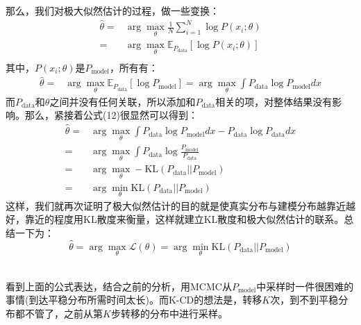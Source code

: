 \documentclass[a4paper]{article}
\begin{document}
那么，我们对极大似然估计的过程，做一些变换：
\begin{equation}
    \begin{split}
        \hat{\theta} = & \arg\max_{\theta} \frac{1}{N} \sum_{i=1}^N \log P(x_i;\theta) \\
        = & \arg\max_{\theta} \mathbb{E}_{P_{\mathrm{data}}}[ \log P(x_i;\theta)] \\
    \end{split}
\end{equation}
其中，$P(x_i;\theta)$是$P_{\mathrm{model}}$，所有有：
\begin{equation}
\begin{split}
    \hat{\theta}
    = & \arg\max_{\theta} \mathbb{E}_{P_{\mathrm{data}}}[ \log P_{\mathrm{model}}]
    = \arg\max_{\theta} \int P_{\mathrm{data}} \log P_{\mathrm{model}} dx
\end{split}
\end{equation}
而$P_{\mathrm{data}}$和$\theta$之间并没有任何关联，所以添加和$P_{\mathrm{data}}$相关的项，对整体结果没有影响。那么，紧接着公式(12)很显然可以得到：
\begin{equation}
    \begin{split}
        \hat{\theta} = & \arg\max_{\theta} \int P_{\mathrm{data}} \log P_{\mathrm{model}} dx - P_{\mathrm{data}}  \log P_{\mathrm{data}} dx \\
        = & \arg\max_{\theta} \int P_{\mathrm{data}} \log \frac{P_{\mathrm{model}}}{P_{\mathrm{data}}} \\
        = & \arg\max_{\theta} -\mathrm{KL}(P_{\mathrm{data}}||P_{\mathrm{model}}) \\
        = & \arg\min_{\theta} \mathrm{KL}(P_{\mathrm{data}}||P_{\mathrm{model}})
    \end{split}
\end{equation}
这样，我们就再次证明了极大似然估计的目的就是使真实分布与建模分布越靠近越好，靠近的程度用KL散度来衡量，这样就建立KL散度和极大似然估计的联系。总结一下为：
$$
\hat{\theta} = \arg\max_\theta \mathcal{L}(\theta) =  \arg\min_{\theta} \mathrm{KL}(P_{\mathrm{data}}||P_{\mathrm{model}})
$$

~\\

看到上面的公式表达，结合之前的分析，用MCMC从$P_{\mathrm{model}}$中采样时一件很困难的事情(到达平稳分布所需时间太长)。而K-CD的想法是，转移$K$次，到不到平稳分布都不管了，之前从第$K$步转移的分布中进行采样。
\end{document}
